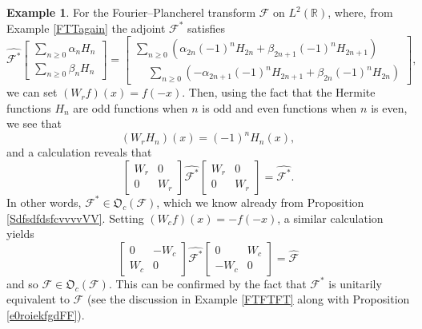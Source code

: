 \documentclass{dis}
\theoremstyle{plain}
\theoremstyle{definition}
\newtheorem{Example}[equation]{Example}
\def\R{\mathbb{R}}
\renewcommand{\geq}{\geqslant}
\newcommand{\0}{{\color{lightgray}0}}
\begin{document}
\begin{Example}\label{examdepleFFTTT}
For the Fourier--Plancherel transform $\mathcal{F}$ on $L^2(\R)$, where, from Example \ref{FTTagain} the adjoint $\mathcal{F}^{*}$ satisfies 
$$\widehat{\mathcal{F^{*}}} \begin{bmatrix}  \sum_{n \geq 0} \alpha_n H_{n}\\ \sum_{n \geq 0} \beta_{n} H_n \end{bmatrix} = \begin{bmatrix} \sum_{n \geq 0} (\alpha_{2n} (-1)^n H_{2n}  + \beta_{2 n + 1} (-1)^n H_{2n + 1})\\
\phantom{-} \sum_{n \geq 0} (-\alpha_{2n + 1} (-1)^n H_{2n + 1}  + \beta_{2 n} (-1)^n H_{2n})\end{bmatrix},$$
 we can set $(W_{r} f)(x) = f(-x)$. Then, using the fact that the Hermite functions $H_{n}$ are odd functions when $n$ is odd and even functions when $n$ is even, we see that   
 $$(W_{r} H_{n})(x) = (-1)^{n} H_{n}(x),$$
and a calculation reveals that 
 $$ \begin{bmatrix} W_{r} & 0\\ 0 & W_{r}\end{bmatrix}  \widehat{\mathcal{F^{*}}}  \begin{bmatrix} W_{r} & 0\\ 0 & W_{r}\end{bmatrix}  = \widehat{\mathcal{F^{*}}}.$$
In other words, $\mathcal{F}^{*} \in \mathfrak{O}_c(\mathcal{F})$, which we know  already from Proposition \ref{SdfsdfdsfcvvvvVV}.
 Setting $(W_{c} f)(x) =- f(-x)$, a similar calculation yields 
  $$ \begin{bmatrix} 0 & -W_{c}\\ W_{c} & 0\end{bmatrix}  \widehat{\mathcal{F^{*}}}  \begin{bmatrix} 0 & W_{c}\\ -W_c & 0 \end{bmatrix}  = \widehat{\mathcal{F}}$$ and so $\mathcal{F} \in \mathfrak{O}_c(\mathcal{F})$. This can be confirmed by the fact that $\mathcal{F}^{*}$ is unitarily equivalent  to $\mathcal{F}$ (see the discussion in Example \ref{FTFTFT}  along with  Proposition \ref{e0roiekfgdFF}).
\end{Example}
\end{document}
